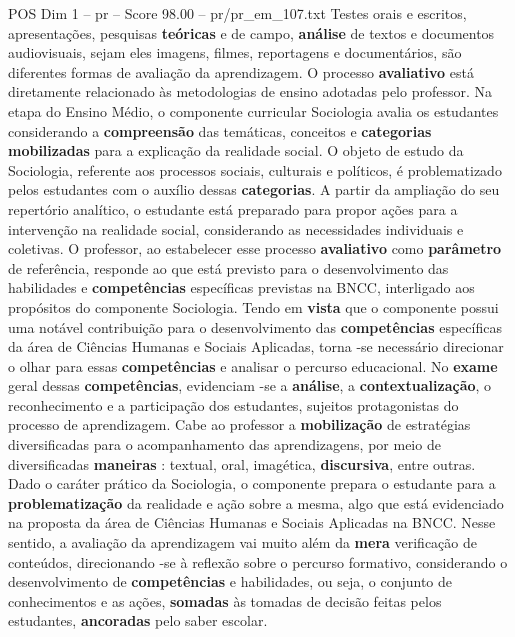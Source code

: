 \begin{textsample}{POS Dim 1 – pr – Score 98.00 – pr/pr\_em\_107.txt}
Testes orais e escritos, apresentações, pesquisas \textbf{teóricas} e de campo, \textbf{análise} de textos e documentos audiovisuais, sejam eles imagens, filmes, reportagens e documentários, são diferentes formas de avaliação da aprendizagem.
O processo \textbf{avaliativo} está diretamente relacionado às metodologias de ensino adotadas pelo professor.
Na etapa do Ensino Médio, o componente curricular Sociologia avalia os estudantes considerando a \textbf{compreensão} das temáticas, conceitos e \textbf{categorias} \textbf{mobilizadas} para a explicação da realidade social.
O objeto de estudo da Sociologia, referente aos processos sociais, culturais e políticos, é problematizado pelos estudantes com o auxílio dessas \textbf{categorias}.
A partir da ampliação do seu repertório analítico, o estudante está preparado para propor ações para a intervenção na realidade social, considerando as necessidades individuais e coletivas.
O professor, ao estabelecer esse processo \textbf{avaliativo} como \textbf{parâmetro} de referência, responde ao que está previsto para o desenvolvimento das habilidades e \textbf{competências} específicas previstas na BNCC, interligado aos propósitos do componente Sociologia.
Tendo em \textbf{vista} que o componente possui uma notável contribuição para o desenvolvimento das \textbf{competências} específicas da área de Ciências Humanas e Sociais Aplicadas, torna -se necessário direcionar o olhar para essas \textbf{competências} e analisar o percurso educacional.
No \textbf{exame} geral dessas \textbf{competências}, evidenciam -se a \textbf{análise}, a \textbf{contextualização}, o reconhecimento e a participação dos estudantes, sujeitos protagonistas do processo de aprendizagem.
Cabe ao professor a \textbf{mobilização} de estratégias diversificadas para o acompanhamento das aprendizagens, por meio de diversificadas \textbf{maneiras} : textual, oral, imagética, \textbf{discursiva}, entre outras.
Dado o caráter prático da Sociologia, o componente prepara o estudante para a \textbf{problematização} da realidade e ação sobre a mesma, algo que está evidenciado na proposta da área de Ciências Humanas e Sociais Aplicadas na BNCC.
Nesse sentido, a avaliação da aprendizagem vai muito além da \textbf{mera} verificação de conteúdos, direcionando -se à reflexão sobre o percurso formativo, considerando o desenvolvimento de \textbf{competências} e habilidades, ou seja, o conjunto de conhecimentos e as ações, \textbf{somadas} às tomadas de decisão feitas pelos estudantes, \textbf{ancoradas} pelo saber escolar.


\end{textsample}
